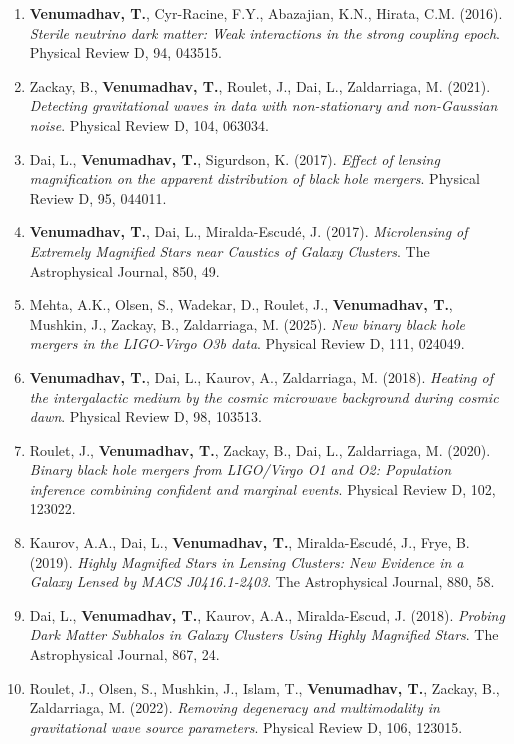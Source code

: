 \documentclass[11pt]{article}
\begin{document}
\begin{enumerate}
\item \textbf{Venumadhav, T.}, Cyr-Racine, F.Y., Abazajian, K.N., Hirata, C.M. (2016). \emph{Sterile neutrino dark matter: Weak interactions in the strong coupling epoch}. Physical Review D, 94, 043515.
\item Zackay, B., \textbf{Venumadhav, T.}, Roulet, J., Dai, L., Zaldarriaga, M. (2021). \emph{Detecting gravitational waves in data with non-stationary and non-Gaussian noise}. Physical Review D, 104, 063034.
\item Dai, L., \textbf{Venumadhav, T.}, Sigurdson, K. (2017). \emph{Effect of lensing magnification on the apparent distribution of black hole mergers}. Physical Review D, 95, 044011.
\item \textbf{Venumadhav, T.}, Dai, L., Miralda-Escudé, J. (2017). \emph{Microlensing of Extremely Magnified Stars near Caustics of Galaxy Clusters}. The Astrophysical Journal, 850, 49.
\item Mehta, A.K., Olsen, S., Wadekar, D., Roulet, J., \textbf{Venumadhav, T.}, Mushkin, J., Zackay, B., Zaldarriaga, M. (2025). \emph{New binary black hole mergers in the LIGO-Virgo O3b data}. Physical Review D, 111, 024049.
\item \textbf{Venumadhav, T.}, Dai, L., Kaurov, A., Zaldarriaga, M. (2018). \emph{Heating of the intergalactic medium by the cosmic microwave background during cosmic dawn}. Physical Review D, 98, 103513.
\item Roulet, J., \textbf{Venumadhav, T.}, Zackay, B., Dai, L., Zaldarriaga, M. (2020). \emph{Binary black hole mergers from LIGO/Virgo O1 and O2: Population inference combining confident and marginal events}. Physical Review D, 102, 123022.
\item Kaurov, A.A., Dai, L., \textbf{Venumadhav, T.}, Miralda-Escudé, J., Frye, B. (2019). \emph{Highly Magnified Stars in Lensing Clusters: New Evidence in a Galaxy Lensed by MACS J0416.1-2403}. The Astrophysical Journal, 880, 58.
\item Dai, L., \textbf{Venumadhav, T.}, Kaurov, A.A., Miralda-Escud, J. (2018). \emph{Probing Dark Matter Subhalos in Galaxy Clusters Using Highly Magnified Stars}. The Astrophysical Journal, 867, 24.
\item Roulet, J., Olsen, S., Mushkin, J., Islam, T., \textbf{Venumadhav, T.}, Zackay, B., Zaldarriaga, M. (2022). \emph{Removing degeneracy and multimodality in gravitational wave source parameters}. Physical Review D, 106, 123015.
\end{enumerate}
\end{document}
